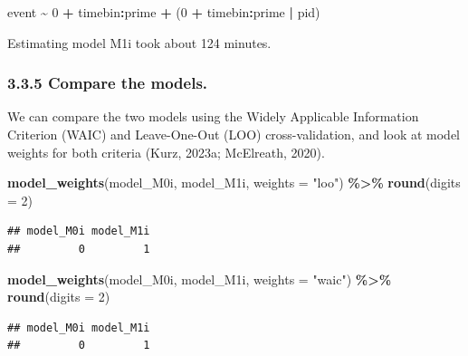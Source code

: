 \documentclass[
  man, donotrepeattitle,floatsintext]{apa6}
\newenvironment{Shaded}{\begin{snugshade}}{\end{snugshade}}
\newcommand{\AttributeTok}[1]{\textcolor[rgb]{0.13,0.29,0.53}{#1}}
\newcommand{\DecValTok}[1]{\textcolor[rgb]{0.00,0.00,0.81}{#1}}
\newcommand{\FunctionTok}[1]{\textcolor[rgb]{0.13,0.29,0.53}{\textbf{#1}}}
\newcommand{\NormalTok}[1]{#1}
\newcommand{\SpecialCharTok}[1]{\textcolor[rgb]{0.81,0.36,0.00}{\textbf{#1}}}
\newcommand{\StringTok}[1]{\textcolor[rgb]{0.31,0.60,0.02}{#1}}
\begin{document}
\begin{Shaded}
\begin{Highlighting}[]
\NormalTok{event }\SpecialCharTok{\textasciitilde{}} \DecValTok{0} \SpecialCharTok{+}\NormalTok{ timebin}\SpecialCharTok{:}\NormalTok{prime }\SpecialCharTok{+}\NormalTok{ (}\DecValTok{0} \SpecialCharTok{+}\NormalTok{ timebin}\SpecialCharTok{:}\NormalTok{prime }\SpecialCharTok{|}\NormalTok{ pid)}
\end{Highlighting}
\end{Shaded}

Estimating model M1i took about 124 minutes.

\subsubsection{3.3.5 Compare the models.}\label{compare-the-models.}

We can compare the two models using the Widely Applicable Information Criterion (WAIC) and Leave-One-Out (LOO) cross-validation, and look at model weights for both criteria (Kurz, 2023a; McElreath, 2020).

\footnotesize

\begin{Shaded}
\begin{Highlighting}[]
\FunctionTok{model\_weights}\NormalTok{(model\_M0i, model\_M1i, }\AttributeTok{weights =} \StringTok{"loo"}\NormalTok{) }\SpecialCharTok{\%\textgreater{}\%} \FunctionTok{round}\NormalTok{(}\AttributeTok{digits =} \DecValTok{2}\NormalTok{)}
\end{Highlighting}
\end{Shaded}

\begin{verbatim}
## model_M0i model_M1i 
##         0         1
\end{verbatim}

\begin{Shaded}
\begin{Highlighting}[]
\FunctionTok{model\_weights}\NormalTok{(model\_M0i, model\_M1i, }\AttributeTok{weights =} \StringTok{"waic"}\NormalTok{) }\SpecialCharTok{\%\textgreater{}\%} \FunctionTok{round}\NormalTok{(}\AttributeTok{digits =} \DecValTok{2}\NormalTok{) }
\end{Highlighting}
\end{Shaded}

\begin{verbatim}
## model_M0i model_M1i 
##         0         1
\end{verbatim}
\end{document}
